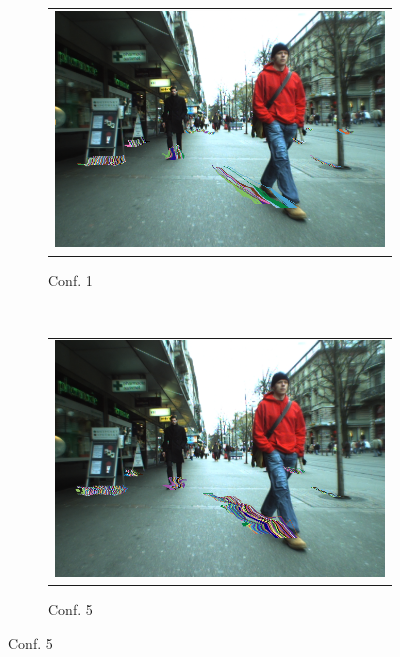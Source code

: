 \begin{figure}[t]
        \centering
        \begin{subfigure}[b]{0.3\textwidth}
	  \begin{tabular}{c}
	    \includegraphics[width=\textwidth]{trackingConf1}
	  \end{tabular}
	  \caption{Conf. 1}\label{fig:cp04_tracking_example_conf_1}
        \end{subfigure}%
        ~
        \begin{subfigure}[b]{0.3\textwidth}
	  \begin{tabular}{c}
	    \includegraphics[width=\textwidth]{trackingConf5}
	  \end{tabular}
	  \caption{Conf. 5}\label{fig:cp04_tracking_example_conf_5}
        \end{subfigure}%

\end{figure}
